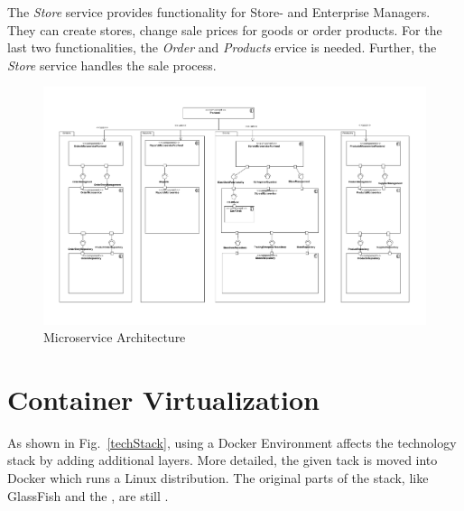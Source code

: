 	The \textit{Store} service provides functionality for Store- and Enterprise Managers. 
	They can create stores, change sale prices for goods or order products. 
	For the last two functionalities, the \textit{Order} and \textit{Products} ervice is needed. 
	Further, the \textit{Store} service handles the sale process. 
	


	
	
	\begin{figure}
	   	\includegraphics[width=\textwidth]{img/MicroserviceArchitecture.pdf}
	   	\caption{Microservice Architecture}
	   	\label{MS_ARch}
	\end{figure}
\newpage

\section{Container Virtualization} \label{Docker}

As shown in Fig.~\ref{techStack}, using a Docker Environment affects the technology stack by adding additional layers. 
More detailed, the given \CoCoME {}tack is moved into  Docker  which runs a Linux distribution. 
The original parts of the stack, like GlassFish and the ,  are still .
	
